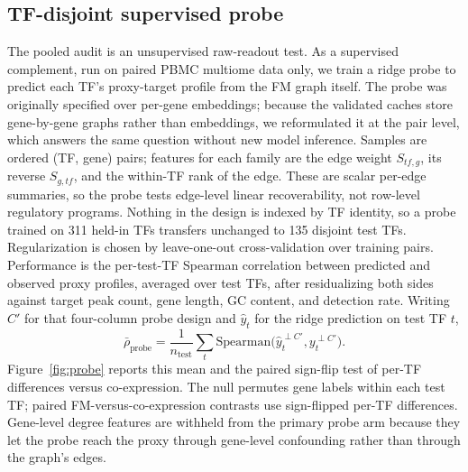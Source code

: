 \documentclass[fleqn,10pt,lineno]{wlpeerj}
\begin{document}
\subsection{TF-disjoint supervised probe}\label{sec:probe}
The pooled audit is an unsupervised raw-readout test. As a supervised complement, run on paired
PBMC multiome data only, we train a ridge
probe to predict each TF's proxy-target profile from the FM graph itself. The probe was originally
specified over per-gene embeddings; because the validated caches store gene-by-gene graphs rather
than embeddings, we reformulated it at the pair level, which answers the same question without new
model inference. Samples are ordered
(TF, gene) pairs; features for each family are the edge weight $S_{tf,g}$, its reverse $S_{g,tf}$,
and the within-TF rank of the edge. These are scalar per-edge summaries, so the probe tests
edge-level linear recoverability, not row-level regulatory programs. Nothing in the design is
indexed by TF identity, so a probe
trained on 311 held-in TFs transfers unchanged to 135 disjoint test TFs. Regularization is chosen
by leave-one-out cross-validation over training pairs. Performance is the per-test-TF Spearman correlation
between predicted and observed proxy profiles, averaged over test TFs, after residualizing both
sides against target peak count, gene length, GC content, and detection rate.
Writing $C'$ for that four-column probe design and $\hat{y}_t$ for the ridge prediction on test TF $t$,
\begin{equation}
\label{eq:probe}
\bar{\rho}_{\mathrm{probe}}
=
\frac{1}{n_{\mathrm{test}}}\sum_{t}
\mathrm{Spearman}\bigl(\hat{y}_t^{\perp C'}, y_t^{\perp C'}\bigr).
\end{equation}
Figure~\ref{fig:probe} reports this mean and the paired sign-flip test of per-TF differences versus co-expression.
The null permutes
gene labels within each test TF; paired FM-versus-co-expression contrasts use sign-flipped
per-TF differences. Gene-level degree features are withheld from the primary probe arm because
they let the probe reach the proxy through gene-level confounding rather than through the graph's
edges.
\end{document}
